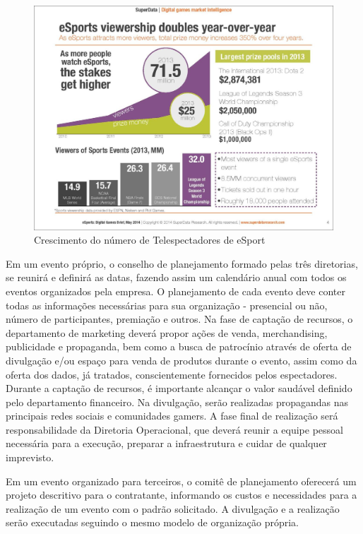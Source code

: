 \documentclass[a4paper, 12pt]{paper}
\begin{document}
\begin{figure}[!ht]
	\centering
	\includegraphics[scale=0.45]{img/img01.png}
	\caption{Crescimento do número de Telespectadores de eSport}
\end{figure}
Em um evento próprio, o conselho de planejamento formado pelas três diretorias, se reunirá e definirá as datas, fazendo assim um calendário anual com todos os eventos organizados pela empresa. O planejamento de cada evento deve conter todas as informações necessárias para sua organização - presencial ou não, número de participantes, premiação e outros. Na fase de captação de recursos, o departamento de marketing deverá propor ações de venda, merchandising, publicidade e propaganda, bem como a busca de patrocínio através de oferta de divulgação e/ou espaço para venda de produtos durante o evento, assim como da oferta dos dados, já tratados, conscientemente fornecidos pelos espectadores. Durante a captação de recursos, é importante alcançar o valor saudável definido pelo departamento financeiro. Na divulgação, serão realizadas propagandas nas principais redes sociais e comunidades gamers. A fase final de realização será responsabilidade da Diretoria Operacional, que deverá reunir a equipe pessoal necessária para a execução, preparar a infraestrutura e cuidar de qualquer imprevisto.

Em um evento organizado para terceiros, o comitê de planejamento oferecerá um projeto descritivo para o contratante, informando os custos e necessidades para a realização de um evento com o padrão solicitado. A divulgação e a realização serão executadas seguindo o mesmo modelo de organização própria.
\end{document}
